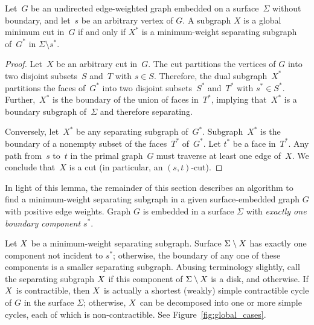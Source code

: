 \documentclass[letterpaper,review]{siamart190516}
\def\Cut{X}
\begin{document}
{\begin{lemma}
\label{lem:mincut-z2}
Let~$G$ be an undirected edge-weighted graph embedded on a surface~$\Sigma$ without boundary, and
let~$s$ be an arbitrary vertex of $G$.
A subgraph $\Cut$ is a global minimum cut in~$G$ if and only if $\Cut^*$ is a minimum-weight separating subgraph
of~$G^*$ in $\Sigma \setminus s^*$.
\end{lemma}

\begin{proof}
  Let~$\Cut$ be an arbitrary cut in~$G$.  The cut partitions the vertices of $G$
  into two disjoint subsets~$S$ and~$T$ with $s \in S$.
  Therefore, the dual subgraph~$\Cut^*$
  partitions the faces of~$G^*$ into two disjoint subsets~$S^*$ and~$T^*$ with $s^* \in S^*$.
  Further,~$\Cut^*$ is the boundary of the union of faces in~$T^*$, implying
  that~$\Cut^*$ is a boundary subgraph of~$\Sigma$ and therefore separating.

  Conversely, let~$\Cut^*$ be any separating subgraph of~$G^*$.
  Subgraph~$\Cut^*$ is the boundary of a nonempty subset of the faces~$T^*$
  of~$G^*$.
  Let $t^*$ be a face in~$T^*$.
  Any path from~$s$ to~$t$ in the primal
  graph~$G$ must traverse at least one edge of~$\Cut$.  We conclude that~$\Cut$ is
  a cut (in particular, an $(s,t)$-cut).
\end{proof}

In light of this lemma, the remainder of this section describes an algorithm to find a minimum-weight separating subgraph in a given surface-embedded graph $G$ with positive edge weights.
Graph $G$ is embedded in a surface $\Sigma$ with \emph{exactly one boundary component $s^*$}.

Let $X$ be a minimum-weight separating subgraph.
Surface $\Sigma \setminus X$ has exactly one component not incident to $s^*$; otherwise, the
boundary of any one of these components is a smaller separating subgraph.
Abusing terminology slightly,
call the separating subgraph $X$  if this component of $\Sigma \setminus
X$ is a disk, and  otherwise.  If $X$ is contractible, then
$X$ is actually a shortest (weakly) simple contractible cycle of $G$ in the surface $\Sigma$; otherwise, $X$ can be decomposed into one or more simple cycles, each of which is non-contractible.  See Figure~\ref{fig:global_cases}.


}
\end{document}
